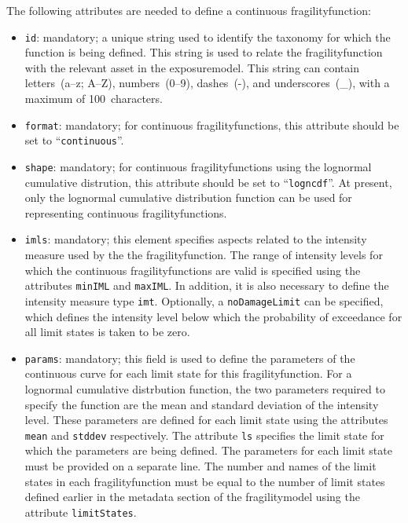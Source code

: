 The following attributes are needed to define a continuous \gls{fragilityfunction}:

\begin{itemize}

    \item \Verb+id+: mandatory; a unique string used to identify the 
      \gls{taxonomy} for which the function is being defined. This string is
      used to relate the \gls{fragilityfunction} with the relevant \gls{asset}
      in the \gls{exposuremodel}. This string can contain letters~(a--z; A--Z),
      numbers~(0--9), dashes~(-), and underscores~(\_), with a maximum of
      100~characters.

    \item \Verb+format+: mandatory; for continuous \glspl{fragilityfunction},
      this attribute should be set to ``\Verb+continuous+''.

    \item \Verb+shape+: mandatory; for continuous \glspl{fragilityfunction}
      using the lognormal cumulative distrution, this attribute should be set
      to ``\Verb+logncdf+''. At present, only the lognormal cumulative
      distribution function can be used for representing continuous
      \glspl{fragilityfunction}.

    \item \Verb+imls+: mandatory; this element specifies aspects related to the
      intensity measure used by the the \gls{fragilityfunction}. The range of 
      intensity levels for which the continuous \glspl{fragilityfunction} are valid
      is specified using the attributes \Verb+minIML+ and \Verb+maxIML+. 
      In addition, it is also necessary to define the intensity measure type 
      \Verb+imt+. Optionally, a \Verb+noDamageLimit+ can be specified, which 
      defines the intensity level below which the probability of exceedance 
      for all limit states is taken to be zero.

    \item \Verb+params+: mandatory; this field is used to define the parameters
      of the continuous curve for each limit state for this 
      \gls{fragilityfunction}. For a lognormal cumulative distrbution function, 
      the two parameters required to specify the function are the mean and 
      standard deviation of the intensity level. These parameters are defined for 
      each limit state using the attributes \Verb+mean+ and \Verb+stddev+ 
      respectively. The attribute \Verb+ls+ specifies the limit state for which 
      the parameters are being defined. The parameters for each limit state
      must be provided on a separate line. The number and names of the limit 
      states in each \gls{fragilityfunction} must be equal to the number of limit 
      states defined earlier in the metadata section of the \gls{fragilitymodel}
      using the attribute \Verb+limitStates+.

\end{itemize}


